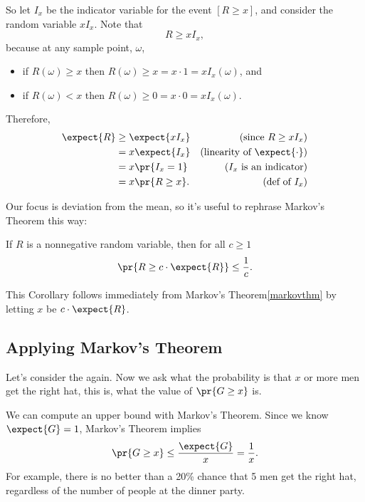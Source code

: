 So let $I_x$ be the indicator variable for the event $[R \geq x]$, and
consider the random variable $x I_x$.  Note that
\[
R \geq x I_x,
\]
because at any sample point, $\omega$,
\begin{itemize}
\item if $R(\omega) \geq x$ then $R(\omega) \geq x = x\cdot 1 = x I_x(\omega)$, and
\item if $R(\omega) < x$ then $R(\omega) \geq 0 = x \cdot 0 = xI_x(\omega)$.
\end{itemize}
Therefore,
\begin{align*}
\expect{R} & \geq \expect{x I_x} & (\text{since } R \geq xI_x)\\
   & = x \expect{I_x} & \text{(linearity of $\expect{\cdot}$)}\\
   & = x \pr{I_x=1}  &  \text{($I_x$ is an indicator)}\\
   & = x \pr{R \geq x}.  &  (\text{def\ of $I_x$})
\end{align*}

\fi

Our focus is deviation from the mean, so it's useful to rephrase
Markov's Theorem this way:
\begin{corollary}
If $R$ is a nonnegative random variable, then for all $c \geq 1$
\begin{equation}
\pr{R \geq c \cdot \expect{R}}  \leq  \frac{1}{c}.\label{markovaboveemean}
\end{equation}
\end{corollary}
This Corollary follows immediately from Markov's Theorem\eqref{markovthm}
by letting $x$ be $c \cdot \expect{R}$.

\iffalse
This gives:
\[
\pr{R \geq c \cdot \expect{R}} \leq \frac{\expect{R}}{c \cdot \expect{R}} =
\frac{1}{c}.
\]
\end{proof}
\fi

\subsection{Applying Markov's Theorem}

Let's consider the  again.  Now we ask what the
probability is that $x$ or more men get the right hat, this is, what the
value of $\pr{G \geq x}$ is.

We can compute an upper bound with Markov's Theorem.  Since we know
$\expect{G}=1$, Markov's Theorem implies
\[
\pr{G \geq x} \leq \frac{\expect{G}}{x} = \frac{1}{x}.
\]
For example, there is no better than a 20\% chance that 5 men get the
right hat, regardless of the number of people at the dinner party.

